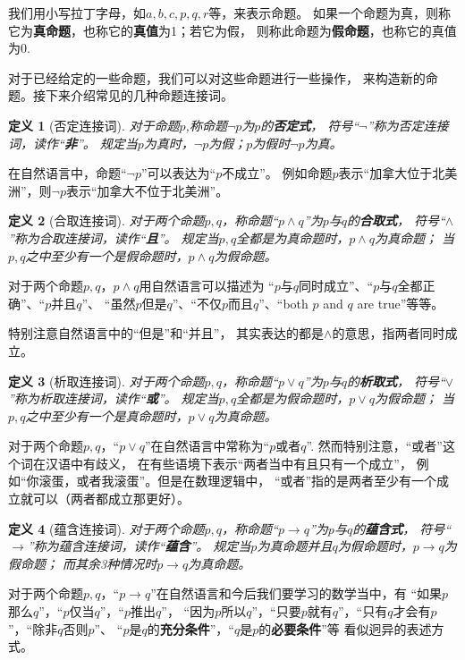 \documentclass[a4paper, 11pt]{article} %
\newcommand*{\vsp}{\vspace{10pt}}
\newtheorem{definition}{定义}[subsection]
\begin{document}
我们用小写拉丁字母，如$a,b,c,p,q,r$等，来表示命题。
如果一个命题为真，则称它为\textbf{真命题}，也称它的\textbf{真值}为1；若它为假，
则称此命题为\textbf{假命题}，也称它的真值为0.\vsp

对于已经给定的一些命题，我们可以对这些命题进行一些操作，
来构造新的命题。接下来介绍常见的几种命题连接词。

\begin{definition}[否定连接词]
对于命题$p$,称命题$\neg p$为$p$的\textbf{否定式}，
符号“$\neg$”称为否定连接词，读作“\textbf{非}”。
规定当$p$为真时，$\neg p$为假；$p$为假时$\neg p$为真。
\end{definition}
在自然语言中，命题“$\neg p$”可以表达为“$p$不成立”。
例如命题$p$表示“加拿大位于北美洲”，则$\neg p$表示“加拿大不位于北美洲”。

\begin{definition}[合取连接词]
对于两个命题$p,q$，称命题“$p\wedge q$”为$p$与$q$的\textbf{合取式}，
符号“$\wedge$”称为合取连接词，读作“\textbf{且}”。
规定当$p,q$全都是为真命题时，$p\wedge q$为真命题；
当$p,q$之中至少有一个是假命题时，$p\wedge q$为假命题。
\end{definition}
对于两个命题$p,q$，$p\wedge q$用自然语言可以描述为
“$p$与$q$同时成立”、“$p$与$q$全都正确”、“$p$并且$q$”、
“虽然$p$但是$q$”、“不仅$p$而且$q$”、“both $p$ and $q$ are true”等等。

特别注意自然语言中的“但是”和“并且”，
其实表达的都是$\wedge$的意思，指两者同时成立。

\begin{definition}[析取连接词]
对于两个命题$p,q$，称命题“$p\vee q$”为$p$与$q$的\textbf{析取式}，
符号“$\vee$”称为析取连接词，读作“\textbf{或}”。
规定当$p,q$全都是为假命题时，$p\vee q$为假命题；
当$p,q$之中至少有一个是真命题时，$p\vee q$为真命题。
\end{definition}
对于两个命题$p,q$，“$p\vee q$”在自然语言中常称为“$p$或者$q$”.
然而特别注意，“或者”这个词在汉语中有歧义，
在有些语境下表示“两者当中有且只有一个成立”，
例如“你滚蛋，或者我滚蛋”。但是在数理逻辑中，
“或者”指的是两者至少有一个成立就可以（两者都成立那更好）。

\begin{definition}[蕴含连接词]
对于两个命题$p,q$，称命题“$p\rightarrow q$”为$p$与$q$的\textbf{蕴含式}，
符号“$\rightarrow$”称为蕴含连接词，读作“\textbf{蕴含}”。
规定当$p$为真命题并且$q$为假命题时，$p\rightarrow q$为假命题；
而其余3种情况时$p\rightarrow q$为真命题。
\end{definition}

对于两个命题$p,q$，“$p\rightarrow q$”在自然语言和今后我们要学习的数学当中，有
“如果$p$那么$q$”，“$p$仅当$q$”，“$p$推出$q$”，
“因为$p$所以$q$”，“只要$p$就有$q$”，“只有$q$才会有$p$”，“除非$q$否则$p$”、
“$p$是$q$的\textbf{充分条件}”，“$q$是$p$的\textbf{必要条件}”等
看似迥异的表述方式。
\end{document}
